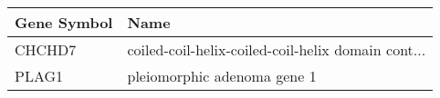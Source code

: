 \begin{tabular}{ll}
\toprule
Gene Symbol &                                               Name \\
\midrule
     CHCHD7 & coiled-coil-helix-coiled-coil-helix domain cont... \\
      PLAG1 &                        pleiomorphic adenoma gene 1 \\
\bottomrule
\end{tabular}
